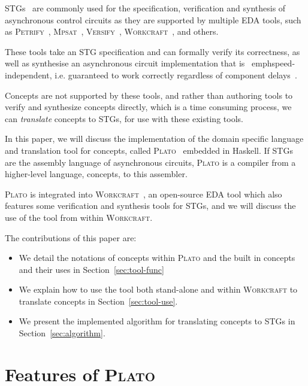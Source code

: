 \documentclass[british,conference,compsoc]{IEEEtran}
\newcommand{\noun}[1]{\textsc{#1}}
\begin{document}
STGs~\cite{Chu_1987_phd}\cite{Rosenblum_1985_tpn} are commonly used for the 
specification, verification and synthesis of asynchronous control circuits as 
they are supported by multiple EDA tools, such as 
\noun{Petrify}~\cite{Cortadella}, \noun{Mpsat}~\cite{khomenko2004detecting}, 
\noun{Versify}~\cite{i1997formal}, 
\noun{Workcraft}~\cite{2007_poliakov_workcraft}\cite{Workcraft_website}, 
and others.

These tools take an STG specification and can formally verify its correctness, 
as well as synthesise an asynchronous circuit implementation that is \
emph{speed-independent}, i.e. guaranteed to work correctly regardless of 
component delays~\cite{Muller_1959_ts}.

Concepts are not supported by these tools, and rather than
authoring tools to verify and synthesize concepts directly, which is a time 
consuming process, we can \emph{translate} concepts to STGs, for use with these
existing tools.

In this paper, we will discuss the implementation of the domain specific 
language and translation tool for concepts, called 
\noun{Plato}~\cite{2016_concepts_github} embedded in Haskell. 
If STGs are the assembly language of asynchronous circuits, \noun{Plato} is a 
compiler from a higher-level language, concepts, to this assembler. 

\noun{Plato} is 
integrated into \noun{Workcraft}~\cite{Workcraft_website}, an open-source 
EDA tool which also features some verification and synthesis tools for STGs, 
and we will discuss the use of the tool from within \noun{Workcraft}.

The contributions of this paper are:
\vspace{-1mm}
\begin{itemize}
  \item We detail the notations of concepts within \noun{Plato} and the built in
  concepts and their uses in Section~\ref{sec:tool-func}
  \item We explain how to use the tool both stand-alone and within
  \noun{Workcraft} to translate concepts in Section~\ref{sec:tool-use}.
  \item We present the implemented algorithm for translating concepts to STGs
  in Section~\ref{sec:algorithm}.
\end{itemize}

\vspace{-5mm}

\section{Features of \noun{Plato}\label{sec:tool-func}}
\end{document}
